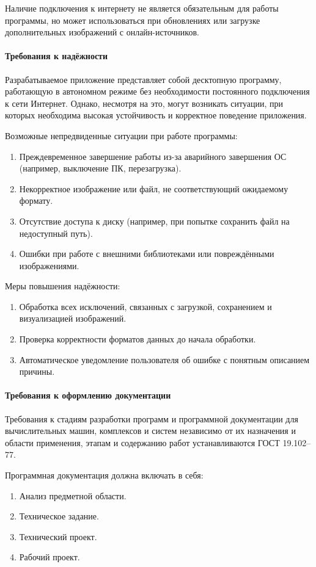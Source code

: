 Наличие подключения к интернету не является обязательным для работы программы, но может использоваться при обновлениях или загрузке дополнительных изображений с онлайн-источников.
\paragraph{Требования к надёжности}

Разрабатываемое приложение представляет собой десктопную программу, работающую в автономном режиме без необходимости постоянного подключения к сети Интернет. Однако, несмотря на это, могут возникать ситуации, при которых необходима высокая устойчивость и корректное поведение приложения.

Возможные непредвиденные ситуации при работе программы:
\begin{enumerate}
	\item Преждевременное завершение работы из-за аварийного завершения ОС (например, выключение ПК, перезагрузка).
	\item Некорректное изображение или файл, не соответствующий ожидаемому формату.
	\item Отсутствие доступа к диску (например, при попытке сохранить файл на недоступный путь).
	\item Ошибки при работе с внешними библиотеками или повреждёнными изображениями.
\end{enumerate}

Меры повышения надёжности:
\begin{enumerate}
	\item Обработка всех исключений, связанных с загрузкой, сохранением и визуализацией изображений.
	\item Проверка корректности форматов данных до начала обработки.
	\item Автоматическое уведомление пользователя об ошибке с понятным описанием причины.
\end{enumerate}
\paragraph{Требования к оформлению документации}

Требования к стадиям разработки программ и программной документации для вычислительных машин, комплексов и систем независимо от их назначения и области применения, этапам и содержанию работ устанавливаются ГОСТ 19.102–77.

Программная документация должна включать в себя:
\begin{enumerate}
	\item Анализ предметной области.
	\item Техническое задание.
	\item Технический проект.
	\item Рабочий проект.	
\end{enumerate}
